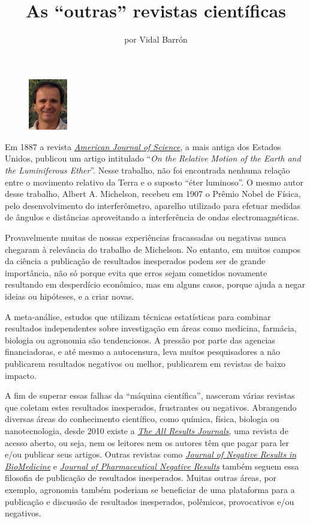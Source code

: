 \title{As ``outras'' revistas científicas}
\author{por Vidal Barrón}
\maketitle
\begin{figure}
\includegraphics[width=0.15\textwidth]{figuras/foto-vidal-barron}
\end{figure}

Em 1887 a revista \href{http://www.ajsonline.org/}{\textit{American Journal of Science}}, a mais antiga dos Estados Unidos, publicou um artigo intitulado ``\textit{On the Relative Motion of the Earth and the Luminiferous Ether}''. Nesse trabalho, não foi encontrada nenhuma relação entre o movimento relativo da Terra e o suposto ``éter luminoso''. O mesmo autor desse trabalho, Albert A. Michelson, recebeu em 1907 o Prêmio Nobel de Física, pelo desenvolvimento do interferômetro, aparelho utilizado para efetuar medidas de ângulos e distâncias aproveitando a interferência de ondas electromagnéticas.

Provavelmente muitas de nossas experiências fracassadas ou negativas nunca chegaram à relevância do trabalho de Michelson. No entanto, em muitos campos da ciência a publicação de resultados inesperados podem ser de grande importância, não só porque evita que erros sejam cometidos novamente resultando em desperdício econômico, mas em alguns casos, porque ajuda a negar ideias ou hipóteses, e a criar novas.

A meta-análise, estudos que utilizam técnicas estatísticas para combinar resultados independentes sobre investigação em áreas como medicina, farmácia, biologia ou agronomia são tendenciosos. A pressão por parte das agencias financiadoras, e até mesmo a autocensura, leva muitos pesquisadores a não publicarem resultados negativos ou melhor, publicarem em revistas de baixo impacto. 

A fim de superar essas falhas da ``máquina científica'', nasceram várias revistas que coletam estes resultados inesperados, frustrantes ou negativos. Abrangendo diversas áreas do conhecimento científico, como química, física, biologia ou nanotecnologia, desde 2010 existe a \href{http://www.arjournals.com/ojs/}{\textit{The All Results Journals}}, uma revista de acesso aberto, ou seja, nem os leitores nem os autores têm que pagar para ler e/ou publicar seus artigos. Outras revistas como \href{http://www.jnrbm.com/}{\textit{Journal of Negative Results in BioMedicine}} e \href{http://www.pnrjournal.com/}{\textit{Journal of Pharmaceutical Negative Results}} também seguem essa filosofia de publicação de resultados inesperados. Muitas outras áreas, por exemplo, agronomia também poderiam se beneficiar de uma plataforma para a publicação e discussão de resultados inesperados, polêmicos, provocativos e/ou negativos.

